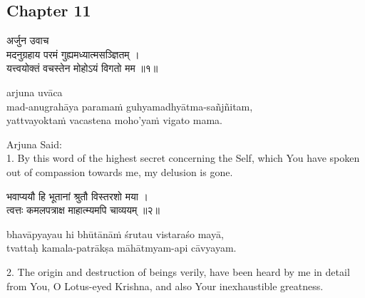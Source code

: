 \chapterdrop

\begin{center}

\headerspace
{}

\section{Chapter 11}

\headerspace
{}

\headerspace
{}

\headerspace
{}

\headerspace
\end{center}

\begin{gitaverse}
अर्जुन उवाच \\
मदनुग्रहाय परमं गुह्यमध्यात्मसञ्ज्ञितम् । \\
यत्त्वयोक्तं वचस्तेन मोहोऽयं विगतो मम ॥१॥
\end{gitaverse}

\begin{transliteration}
arjuna uvāca \\
mad-anugrahāya paramaṁ guhyamadhyātma-sañjñitam, \\
yattvayoktaṁ vacastena moho'yaṁ vigato mama.
\end{transliteration}

Arjuna Said: \\
1. By this word of the highest secret concerning the Self, which You have
spoken out of compassion towards me, my delusion is gone.

\begin{gitaverse}
भवाप्ययौ हि भूतानां श्रुतौ विस्तरशो मया । \\
त्वत्तः कमलपत्राक्ष माहात्म्यमपि चाव्ययम् ॥२॥
\end{gitaverse}

\begin{transliteration}
bhavāpyayau hi bhūtānāṁ śrutau vistaraśo mayā, \\
tvattaḥ kamala-patrākṣa māhātmyam-api cāvyayam.
\end{transliteration}

2. The origin and destruction of beings verily, have been heard by me in detail
from You, O Lotus-eyed Krishna, and also Your inexhaustible greatness.

